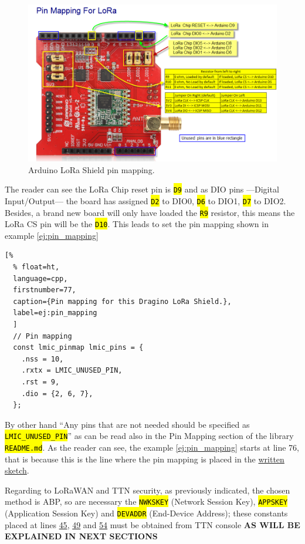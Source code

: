 \documentclass[11pt,a4paper,dvipsnames,twoside]{article}
\newcommand{\doubt}[1] {\textbf{\color{Red3}#1}}
\newcommand{\cmd}[1] {\hl{\texttt{#1}}}
\begin{document}
\begin{figure}[ht]
  \centering
  \includegraphics[width=.9\textwidth]{../pictures/LoRa_Shield_Pin_Mapping.png}
  \caption{Arduino LoRa Shield pin mapping.}
  \label{fig:Ard_LoRa_Shield_pin_mapping}
\end{figure}

The reader can see the LoRa Chip reset pin is \cmd{D9} and as DIO pins ---Digital Input/Output--- the board has assigned \cmd{D2} to DIO0, \cmd{D6} to DIO1, \cmd{D7} to DIO2. Besides, a brand new board will only have loaded the \cmd{R9} resistor, this means the LoRa CS pin will be the \cmd{D10}. This leads to set the pin mapping shown in example \ref{ej:pin_mapping}

\begin{lstlisting}[%
  % float=ht,
  language=cpp,
  firstnumber=77,
  caption={Pin mapping for this Dragino LoRa Shield.},
  label=ej:pin_mapping
  ]
  // Pin mapping
  const lmic_pinmap lmic_pins = {
    .nss = 10,
    .rxtx = LMIC_UNUSED_PIN,
    .rst = 9,
    .dio = {2, 6, 7},
  };
\end{lstlisting}

By other hand \enquote{Any pins that are not needed should be specified as \cmd{LMIC\_UNUSED\_PIN}} as can be read also in the Pin Mapping section of the library \cmd{README.md}. As the reader can see, the example \ref{ej:pin_mapping} starts at line 76, that is because this is the line where the pin mapping is placed in the \href{https://github.com/WyRe/lora-arduino-dendrometer/blob/master/src/arduino/dendro/dendro.ino#L76}{written sketch}.

Regarding to LoRaWAN and TTN security, as previously indicated, the chosen method is ABP, so are necessary the \cmd{NWKSKEY} (Network Session Key), \cmd{APPSKEY} (Application Session Key) and \cmd{DEVADDR} (End-Device Address); these constants placed at lines \href{https://github.com/WyRe/lora-arduino-dendrometer/blob/master/src/arduino/dendro/dendro.ino#L45}{45}, \href{https://github.com/WyRe/lora-arduino-dendrometer/blob/master/src/arduino/dendro/dendro.ino#L49}{49} and \href{https://github.com/WyRe/lora-arduino-dendrometer/blob/master/src/arduino/dendro/dendro.ino#L54}{54} must be obtained from TTN console \doubt{AS WILL BE EXPLAINED IN NEXT SECTIONS}
\end{document}
